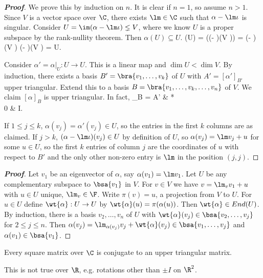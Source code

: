 \begin{proof}[\bf Proof]
We prove this by induction on $n$. It is clear if $n = 1$, so assume $n > 1$. Since $V$ is a vector space over $\C$, there exists $\lm \in \C$ such that $\alpha - \lm\iota$ is singular. Consider $U = \im(\alpha-\lm\iota) \lneq V$, where we know $U$ is a proper subspace by the rank-nullity theorem. Then $\alpha(U) \subseteq U$.
\be
\alpha(U) = \alpha((\alpha - \lm\iota)(V )) = (\alpha - \lm\iota)(\alpha V ) \leq  (\alpha - \lm\iota)(V ) = U.
\ee

Consider $\alpha' = \alpha|_U : U \to U$. This is a linear map and $\dim U < \dim V$. By induction, there exists a basis $B' = \bra{v_1, \dots, v_k}$ of $U$ with $A' = [\alpha']_{B'}$ upper triangular. Extend this to a basis $B = \bra{v_1, \dots, v_k, \dots, v_n}$ of $V$. We claim $[\alpha]_B$ is upper triangular. In fact,
\be
[\alpha]_B = \bepm A' & * \\ 0 & \lm I\eepm.
\ee

If $1 \leq  j \leq  k$, $\alpha(v_j) = \alpha'(v_j) \in U$, so the entries in the first $k$ columns are as claimed. If $j > k$, $(\alpha - \lm\iota)(v_j)\in U$ by definition of $U$, so $\alpha(v_j) = \lm v_j + u$ for some $u \in U$, so the first $k$ entries of column $j$ are the coordinates of $u$ with respect to $B'$ and the only other non-zero entry is $\lm$ in the position $(j, j)$.
\end{proof}

\begin{proof}[\bf Proof]
Let $v_1$ be an eigenvector of $\alpha$, say $\alpha(v_1) = \lm v_1$. Let $U$ be any complementary subspace to $\bsa{v_1}$ in $V$. For $v \in V$ we have $v = \lm_v v_1+u$ with $u \in U$ unique, $\lm_v \in \F$. Write $\pi(v) = u$, a projection from $V$ to $U$. For $u \in U$ define $\wt{\alpha} : U \to U$ by $\wt{\alpha}(u) = \pi(\alpha(u))$. Then $\wt{\alpha} \in End(U)$. By induction, there is a basis $v_2, \dots, v_n$ of $U$ with $\wt{\alpha}(v_j) \in \bsa{v_2, \dots, v_j}$ for $2 \leq  j \leq  n$. Then $\alpha(v_j) = \lm_{\alpha(v_j)} v_j + \wt{\alpha}(v_j) \in \bsa{v_1, \dots, v_j}$ and $\alpha(v_1) \in \bsa{v_1}$.
\end{proof}

\begin{theorem}
Every square matrix over $\C$ is conjugate to an upper triangular matrix.
\end{theorem}

\begin{remark}
This is not true over $\R$, e.g. rotations other than $\pm I$ on $\R^2$.
\end{remark}


